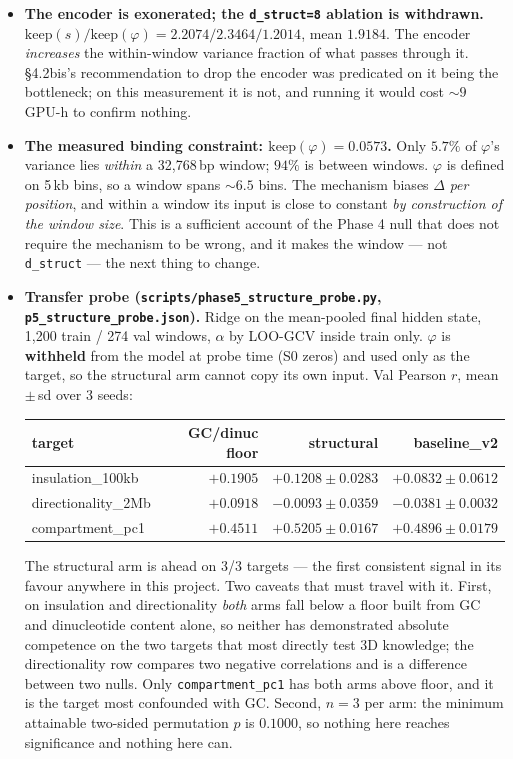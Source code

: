 \documentclass[11pt,a4paper]{article}
\newcommand{\code}[1]{\texttt{\small #1}}
\begin{document}
\begin{itemize}
\item \textbf{The encoder is exonerated; the \code{d\_struct=8} ablation is
withdrawn.} $\mathrm{keep}(s)/\mathrm{keep}(\varphi) = 2.2074 / 2.3464 /
1.2014$, mean $1.9184$. The encoder \emph{increases} the within-window variance
fraction of what passes through it. \S4.2bis's recommendation to drop the
encoder was predicated on it being the bottleneck; on this measurement it is
not, and running it would cost ${\sim}9$ GPU-h to confirm nothing.

\item \textbf{The measured binding constraint: $\mathrm{keep}(\varphi) =
0.0573$.} Only $5.7\%$ of $\varphi$'s variance lies \emph{within} a 32{,}768\,bp
window; $94\%$ is between windows. $\varphi$ is defined on 5\,kb bins, so a
window spans ${\sim}6.5$ bins. The mechanism biases $\Delta$ \emph{per
position}, and within a window its input is close to constant \emph{by
construction of the window size}. This is a sufficient account of the Phase 4
null that does not require the mechanism to be wrong, and it makes the window
--- not \code{d\_struct} --- the next thing to change.

\item \textbf{Transfer probe (\code{scripts/phase5\_structure\_probe.py},
\code{p5\_structure\_probe.json}).} Ridge on the mean-pooled final hidden state,
1{,}200 train / 274 val windows, $\alpha$ by LOO-GCV inside train only.
$\varphi$ is \textbf{withheld} from the model at probe time (S0 zeros) and used
only as the target, so the structural arm cannot copy its own input. Val
Pearson $r$, mean\,$\pm$\,sd over 3 seeds:

\begin{center}
\begin{tabular}{lrrr}
\toprule
target & GC/dinuc floor & structural & baseline\_v2 \\
\midrule
insulation\_100kb   & $+0.1905$ & $+0.1208 \pm 0.0283$ & $+0.0832 \pm 0.0612$ \\
directionality\_2Mb & $+0.0918$ & $-0.0093 \pm 0.0359$ & $-0.0381 \pm 0.0032$ \\
compartment\_pc1    & $+0.4511$ & $+0.5205 \pm 0.0167$ & $+0.4896 \pm 0.0179$ \\
\bottomrule
\end{tabular}
\end{center}

The structural arm is ahead on 3/3 targets --- the first consistent signal in
its favour anywhere in this project. Two caveats that must travel with it.
First, on insulation and directionality \emph{both} arms fall below a floor
built from GC and dinucleotide content alone, so neither has demonstrated
absolute competence on the two targets that most directly test 3D knowledge;
the directionality row compares two negative correlations and is a difference
between two nulls. Only \code{compartment\_pc1} has both arms above floor, and
it is the target most confounded with GC. Second, $n=3$ per arm: the minimum
attainable two-sided permutation $p$ is $0.1000$, so nothing here reaches
significance and nothing here can.


\end{itemize}
\end{document}
